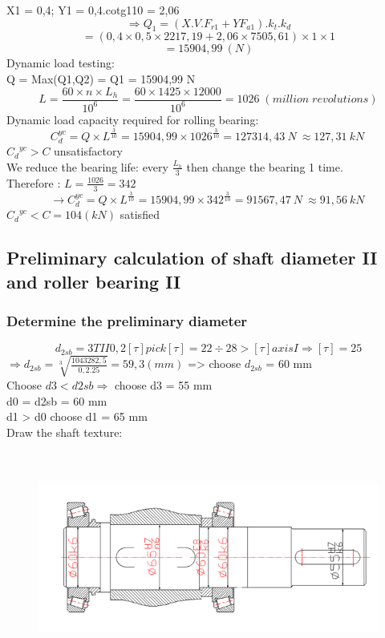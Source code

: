 	X1 = 0,4; Y1 = 0,4.cotg110 = 2,06
$$	\Rightarrow Q_1=(X.V.F_{r1}+YF_{a1}).k_t.k_d$$
$$ =\left(0,4\times0,5\times2217,19+2,06\times7505,61\right)\times1\times1$$
$$=15904,99\ (N)$$
Dynamic load testing:\\
Q = Max(Q1,Q2) = Q1 = 15904,99 N\\
$$L=\frac{60\times n\times L_h}{{10}^6}=\frac{60\times1425\times12000}{{10}^6}=1026 \; ( million\; revolutions)$$
Dynamic load capacity required for rolling bearing:\\
$$C_d^{yc}=Q\times L^\frac{3}{10}=15904,99\times{1026}^\frac{3}{10}=127314,43\ N\ \approx127,31\ kN\ $$
${C_d}^{yc}>C $ unsatisfactory\\
We reduce the bearing life: every $\frac{L_h}{3}$ then change the bearing 1 time.\\
 Therefore : $L = \frac{1026}{3}=342$
 $${\rightarrow C}_d^{yc}=Q\times L^\frac{3}{10}=15904,99\times{342}^\frac{3}{10}=91567,47\ N\ \approx91,56\ kN\ $$
$ {C_d}^{yc}<C=104(kN) $ satisfied
\subsection{Preliminary calculation of shaft diameter II and roller bearing II}
\subsubsection{Determine the preliminary diameter}
$$d_{2sb}=3TII0,2[τ] pick [\tau]=22÷28>[τ] axis I \Rightarrow[\tau]=25$$
$\Rightarrow d_{2sb}=\sqrt[3]{\frac{1043282,5}{0,2.25}}=59,3 (mm) $ => choose $d_{2sb}$  = 60 mm\\
Choose $d3 <d2sb \Rightarrow $ choose d3  = 55 mm\\
d0 = d2sb = 60 mm\\
d1 > d0 choose d1 = 65 mm\\
Draw the shaft texture:\\
\begin{figure}[!ht]
    \centering
   \centerline{\includegraphics[width=16cm,height=7cm]{Image/Picture4.png}}
    \label{figure1}
\end{figure}
